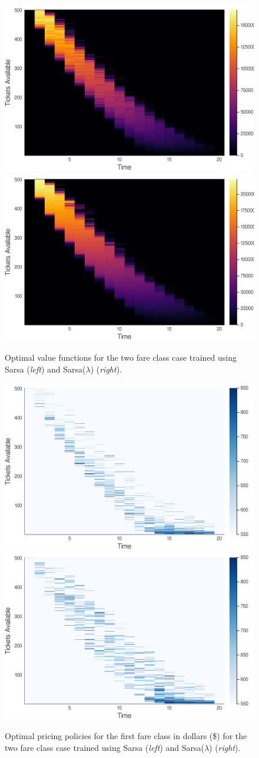 \documentclass[letterpaper]{article}%
\begin{document}
\vfill\null

\begin{figure}[h!]
    \centering
    \label{fig:two-class-sarsa-U}
    \includegraphics[width=0.48\linewidth]{final-paper/plots/doubleAgentSarsa-U.png} \;
    \includegraphics[width=0.48\linewidth]{final-paper/plots/doubleAgentSarsaLambda-U.png}
    \caption{Optimal value functions for the two fare class case trained using Sarsa (\textit{left}) and Sarsa($\lambda$) (\textit{right}).}
\end{figure}

\begin{figure}[h!]
    \centering
    \label{fig:two-class-sarsa-policy1}
    \includegraphics[width=0.48\linewidth]{final-paper/plots/doubleAgentSarsa-1policy.png} \;
    \includegraphics[width=0.48\linewidth]{final-paper/plots/doubleAgentSarsaLambda-1policy.png}
    \caption{Optimal pricing policies for the first fare class in dollars (\$) for the two fare class case trained using Sarsa (\textit{left}) and Sarsa($\lambda$) (\textit{right}).}
\end{figure}
\end{document}
